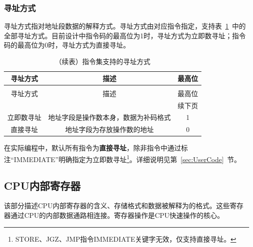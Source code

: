 \documentclass[lang=cn,a4paper,newtx]{elegantpaper}
\begin{document}
\subsubsection{寻址方式}
寻址方式指对地址段数据的解释方式。寻址方式由对应指令指定，支持表~\ref{tab:ISA:addressingmode}~中的全部寻址方式。目前设计中指令码的最高位为1时，寻址方式为立即数寻址；指令码的最高位为0时，寻址方式为直接寻址。


\begin{longtable}{c c c}
  \caption{指令集支持的寻址方式} \label{tab:ISA:addressingmode} \\
  \toprule
  寻址方式  & 描述 & 最高位\\
  \midrule
  \endfirsthead
  
  \caption[]{（续表）指令集支持的寻址方式} \\
  \toprule
  寻址方式  & 描述 & 最高位\\
  \midrule
  \endhead
  
  \midrule
  \multicolumn{3}{r}{续下页} \\
  \midrule
  \endfoot
  
  \bottomrule
  \endlastfoot
  
  立即数寻址   &  地址字段是操作数本身，数据为补码格式  & 1\\
  直接寻址 &  地址字段为存放操作数的地址    & 0\\
\end{longtable}

在实际编程中，默认所有指令为\textbf{直接寻址}，除非指令中通过标注“IMMEDIATE”明确指定为立即数寻址\footnote{STORE、JGZ、JMP指令IMMEDIATE关键字无效，仅支持直接寻址。}。详细说明见第~\ref{sec:UserCode}~节。
\subsection{CPU内部寄存器}
该部分描述CPU内部寄存器的含义、存储格式和数据被解释为的格式。这些寄存器通过CPU的内部数据通路相连接。寄存器操作是CPU快速操作的核心。
\end{document}
